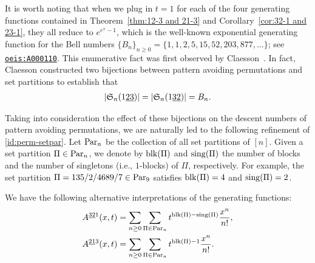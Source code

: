 \begin{remark}
It is worth noting that when we plug in $t=1$ for each of the four generating functions contained in Theorem~\ref{thm:12-3 and 21-3} and Corollary~\ref{cor:32-1 and 23-1}, they all reduce to $e^{e^x-1}$, which is the well-known exponential generating function for the Bell numbers $\{B_n\}_{n\ge 0}=\{1,1,2,5,15,52,203,877,\ldots\}$; see \href{https://oeis.org/A000110}{\tt{oeis:A000110}}. This enumerative fact was first observed by Claesson~\cite[Prop.~2 and 3]{cla01}. In fact, Claesson constructed two bijections between pattern avoiding permutations and set partitions to establish that
\begin{align}\label{id:perm-setpar}
|\S_n(1\underline{23})|=|\S_n(1\underline{32})|=B_n.
\end{align}
\end{remark}

Taking into consideration the effect of these bijections on the descent numbers of pattern avoiding permutations, we are naturally led to the following refinement of \eqref{id:perm-setpar}. Let $\Par_n$ be the collection of all set partitions of $[n]$. Given a set partition $\Pi\in\Par_n$, we denote by $\blk(\Pi)$ and $\sing(\Pi)$ the number of blocks and the number of singletons (i.e., $1$-blocks) of $\Pi$, respectively. For example, the set partition $\Pi=135/2/4689/7\in\Par_9$ satisfies $\blk(\Pi)=4$ and $\sing(\Pi)=2$.

\begin{corollary}
We have the following alternative interpretations of the generating functions:
\begin{align}
\label{id:gf321 in setpar}
A^{\underline{32}1}(x,t) &= \sum_{n\ge 0}\sum_{\Pi\in\Par_n}t^{\blk(\Pi)-\sing(\Pi)}\frac{x^n}{n!},\\
A^{\underline{21}3}(x,t) &= \sum_{n\ge 0}\sum_{\Pi\in\Par_n}t^{\blk(\Pi)-1}\frac{x^n}{n!}.
\label{id:gf213 in setpar}
\end{align}
\end{corollary}

